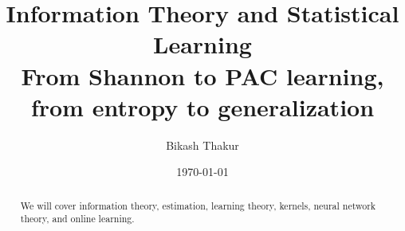 \documentclass[11pt]{article}
\title{%
{\sffamily\huge\bfseries\color{DarkNavy} Information Theory and Statistical Learning}\\[6pt]
{\sffamily\large\color{AccentGray} From Shannon to PAC learning, from entropy to generalization}
}
\author{{\sffamily Bikash Thakur}}
\date{{\sffamily\small\color{AccentGray} \today}}
\begin{document}
\pagecolor{OffWhite}
\color{DarkNavy}

\maketitle
\thispagestyle{plain}

\begin{abstract}
\noindent
We will cover information theory, estimation, learning theory, kernels, neural network theory, and online learning.
\end{abstract}

\tableofcontents
\newpage



\printindex
\end{document}
